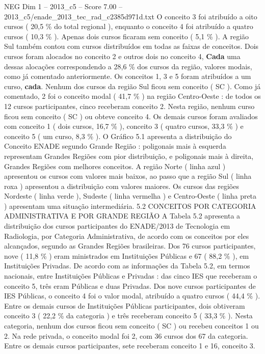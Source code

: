 \begin{textsample}{NEG Dim 1 – 2013\_c5 – Score 7.00 – 2013\_c5/enade\_2013\_tec\_rad\_c2385d971d.txt}
O conceito 3 foi atribuído a oito cursos ( 20,5 \% do total regional ), enquanto o conceito 4 foi atribuído a quatro cursos ( 10,3 \% ).
Apenas dois cursos ficaram sem conceito ( 5,1 \% ).
A região Sul também contou com cursos distribuídos em todas as faixas de conceitos.
Dois cursos foram alocados no conceito 2 e outros dois no conceito 4, \textbf{Cada} uma dessas alocações correspondendo a 28,6 \% dos cursos da região, valores modais, como já comentado anteriormente.
Os conceitos 1, 3 e 5 foram atribuídos a um curso, \textbf{cada}.
Nenhum dos cursos da região Sul ficou sem conceito ( SC ).
Como já comentado, 2 foi o conceito modal ( 41,7 \% ) na região Centro-Oeste : de todos os 12 cursos participantes, cinco receberam conceito 2.
Nesta região, nenhum curso ficou sem conceito ( SC ) ou obteve conceito 4.
Os demais cursos foram avaliados com conceito 1 ( dois cursos, 16,7 \% ), conceito 3 ( quatro cursos, 33,3 \% ) e conceito 5 ( um curso, 8,3 \% ).
O Gráfico 5.1 apresenta a distribuição do Conceito ENADE segundo Grande Região : poligonais mais à esquerda representam Grandes Regiões com pior distribuição, e poligonais mais à direita, Grandes Regiões com melhores conceitos.
A região Norte ( linha azul ) apresentou os cursos com valores mais baixos, ao passo que a região Sul ( linha roxa ) apresentou a distribuição com valores maiores.
Os cursos das regiões Nordeste ( linha verde ), Sudeste ( linha vermelha ) e Centro-Oeste ( linha preta ) apresentam uma situação intermediária. 5.2 CONCEITOS POR CATEGORIA ADMINISTRATIVA E POR GRANDE REGIÃO A Tabela 5.2 apresenta a distribuição dos cursos participantes do ENADE/2013 de Tecnologia em Radiologia, por Categoria Administrativa, de acordo com os conceitos por eles alcançados, segundo as Grandes Regiões brasileiras.
Dos 76 cursos participantes, nove ( 11,8 \% ) eram ministrados em Instituições Públicas e 67 ( 88,2 \% ), em Instituições Privadas.
De acordo com as informações da Tabela 5.2, em termos nacionais, entre Instituições Públicas e Privadas : das cinco IES que receberam o conceito 5, três eram Públicas e duas Privadas.
Dos nove cursos participantes de IES Públicas, o conceito 4 foi o valor modal, atribuído a quatro cursos ( 44,4 \% ).
Entre os demais cursos de Instituições Públicas participantes, dois obtiveram conceito 3 ( 22,2 \% da categoria ) e três receberam conceito 5 ( 33,3 \% ).
Nesta categoria, nenhum dos cursos ficou sem conceito ( SC ) ou recebeu conceitos 1 ou 2.
Na rede privada, o conceito modal foi 2, com 36 cursos dos 67 da categoria.
Entre os demais cursos participantes, sete receberam conceito 1 e 16, conceito 3.

\end{textsample}
